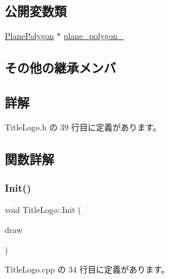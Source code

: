 \subsection*{公開変数類}
\begin{DoxyCompactItemize}
\item 
\mbox{\hyperlink{class_plane_polygon}{Plane\+Polygon}} $\ast$ \mbox{\hyperlink{class_title_logo_a842ef60ff79632e1dad76599952eb95a}{plane\+\_\+polygon\+\_\+}}
\end{DoxyCompactItemize}
\subsection*{その他の継承メンバ}


\subsection{詳解}


 Title\+Logo.\+h の 39 行目に定義があります。



\subsection{関数詳解}
\mbox{\label{class_title_logo_a1e07aae4771bd7a44cb7e3b55b72b9f3}} 
\subsubsection{\texorpdfstring{Init()}{Init()}}
{\footnotesize\ttfamily void Title\+Logo\+::\+Init (\begin{DoxyParamCaption}\item[{\mbox{\hyperlink{class_draw_base}{Draw\+Base}} $\ast$}]{draw }\end{DoxyParamCaption})}



 Title\+Logo.\+cpp の 34 行目に定義があります。

